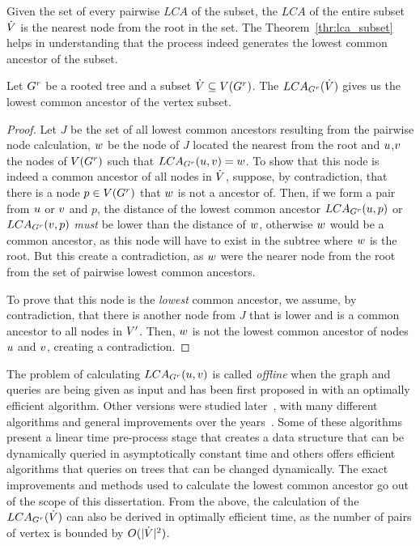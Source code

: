 \documentclass[msc,english,table,xcdraw]{ppgccufmg}
\begin{document}
Given the set of every pairwise $LCA$ of the subset, the $LCA$ of the entire 
subset $\dot{V}$ is the nearest node from the root in the set.
The Theorem~\ref{thr:lca_subset} helps in understanding that the process indeed 
generates the lowest common ancestor of the subset.

\begin{theorem}
\label{thr:lca_subset}
Let $G^{r}$ be a rooted tree and a subset $\dot{V} \subseteq 
V(G^{r})$. 
The $LCA_{G^{r}}(\dot{V})$ gives us the lowest common ancestor of the vertex 
subset.
\end{theorem}

\begin{proof}
Let $J$ be the set of all lowest common ancestors resulting from the pairwise
node calculation, $w$ be the node of $J$ located the nearest from
the root and $u$,$v$ the nodes of $V(G^{r})$ such that
$LCA_{G^{r}}(u,v) = w$.
To show that this node is indeed a common ancestor of all nodes in 
$\dot{V}$, suppose, by contradiction, that there is a node $p \in 
V(G^{r})$ that $w$ is not a ancestor of.
Then, if we form a pair from $u$ or $v$ and $p$, the distance of 
the lowest common ancestor $LCA_{G^{r}}(u, p)$ or $LCA_{G^{r}}(v, p)$ 
\textit{must} be lower than the distance of $w$, otherwise $w$ 
would be a common ancestor, as this node will have to exist in the subtree where 
$w$ is the root.
But this create a contradiction, as $w$ were the nearer node from the 
root from the set of pairwise lowest common ancestors.

To prove that this node is the \textit{lowest} common ancestor, we assume, by
contradiction, that there is another node from $J$ that is lower and is a common
ancestor to all nodes in $V'$.
Then, $w$ is not the lowest common ancestor of nodes $u$ and 
$v$, creating a contradiction.
\end{proof}


The problem of calculating $LCA_{G^{r}}(u, v)$ is called \textit{offline} 
when the graph and queries are being given as input and has been first proposed 
in \citep{Aho:1973} with an optimally efficient algorithm. 
Other versions were studied later~\citep{Harel:1984}, with many different 
algorithms and general improvements over the years~\citep{Alstrup:2004}.
Some of these algorithms present a linear time pre-process stage that creates a 
data structure that can be dynamically queried in asymptotically constant time 
and others offers efficient algorithms that queries on trees that can be changed
dynamically.
The exact improvements and methods used to calculate the lowest common ancestor 
go out of the scope of this dissertation.
From the above, the calculation of the $LCA_{G^{r}}(\dot{V})$ can also be
derived in optimally efficient time, as the number of pairs of vertex is bounded 
by $O(|\dot{V}|^2)$.
\end{document}
